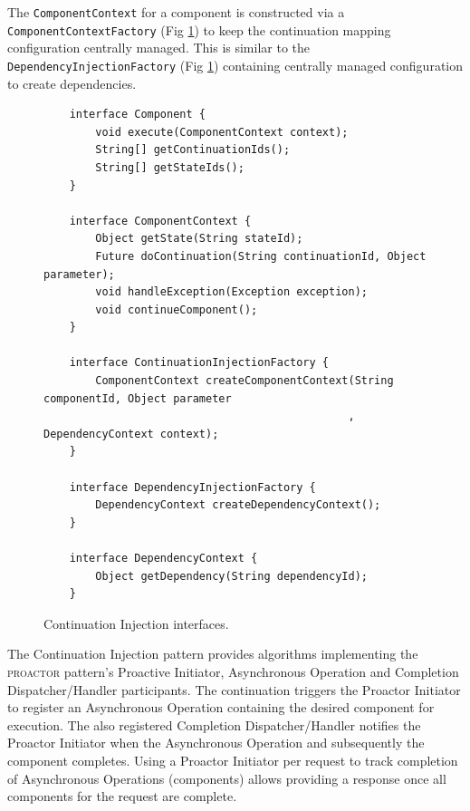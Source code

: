 \documentclass[prodmode]{style/acmlarge}
\begin{document}
The \texttt{ComponentContext} for a component is constructed via a
\texttt{ComponentContextFactory} (Fig \ref{fig:ContinuationInjectionInterfaces})
to keep the continuation mapping configuration centrally managed.  This is
similar to the \texttt{DependencyInjectionFactory} (Fig
\ref{fig:ContinuationInjectionInterfaces}) containing centrally managed
configuration to create dependencies.

\begin{figure}[tp]
\centering
\begin{verbatim}
    interface Component {
        void execute(ComponentContext context);
        String[] getContinuationIds();
        String[] getStateIds();
    }

    interface ComponentContext {
        Object getState(String stateId);
        Future doContinuation(String continuationId, Object parameter);
        void handleException(Exception exception);
        void continueComponent();
    }
    
    interface ContinuationInjectionFactory {
        ComponentContext createComponentContext(String componentId, Object parameter
                                               , DependencyContext context);
    }
    
    interface DependencyInjectionFactory {
        DependencyContext createDependencyContext();
    }
    
    interface DependencyContext {
        Object getDependency(String dependencyId);
    }
\end{verbatim}
\caption{Continuation Injection interfaces\footnotemark.}
\label{fig:ContinuationInjectionInterfaces}
\end{figure}

The Continuation Injection pattern provides algorithms implementing the
\textsc{proactor} pattern's Proactive Initiator, Asynchronous Operation and
Completion Dispatcher/Handler participants.  The continuation triggers the
Proactor Initiator to register an Asynchronous Operation containing the desired
component for execution.  The also registered Completion Dispatcher/Handler
notifies the Proactor Initiator when the Asynchronous Operation and subsequently
the component completes.  Using a Proactor Initiator per request to track
completion of Asynchronous Operations (components) allows providing a response
once all components for the request are complete.
\end{document}
